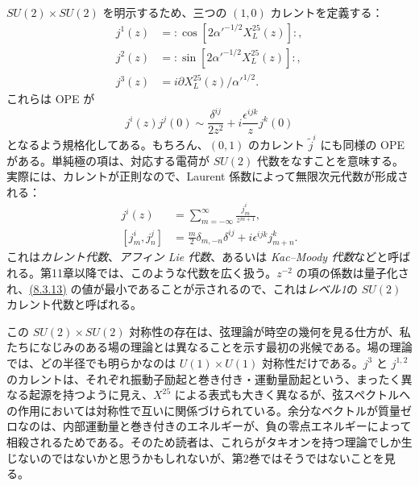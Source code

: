 $SU(2)\times SU(2)$ を明示するため、三つの $(1,0)$ カレントを定義する：
\begin{align}
j^1(z)&=:\cos[2\alpha'^{-1/2}X_L^{25}(z)]:,
\tag{8.3.12a}\label{eq:8.3.12a}\\
j^2(z)&=:\sin[2\alpha'^{-1/2}X_L^{25}(z)]:,
\tag{8.3.12b}\label{eq:8.3.12b}\\
j^3(z)&=i\partial X_L^{25}(z)/\alpha'^{1/2}.
\tag{8.3.12c}\label{eq:8.3.12c}
\end{align}
これらは OPE が
\begin{equation}
j^i(z)j^j(0)\sim\frac{\delta^{ij}}{2z^2}+i\frac{\epsilon^{ijk}}zj^k(0)
\tag{8.3.13}\label{eq:8.3.13}
\end{equation}
となるよう規格化してある。もちろん、$(0,1)$ のカレント $\widetilde j^i$ にも同様の OPE がある。単純極の項は、対応する電荷が $SU(2)$ 代数をなすことを意味する。実際には、カレントが正則なので、Laurent 係数によって無限次元代数が形成される：
\begin{align}
j^i(z)&=\sum_{m=-\infty}^{\infty}\frac{j_m^i}{z^{m+1}},
\tag{8.3.14a}\label{eq:8.3.14a}\\
[j_m^i,j_n^j]&=\frac m2\delta_{m,-n}\delta^{ij}+i\epsilon^{ijk}j_{m+n}^k.
\tag{8.3.14b}\label{eq:8.3.14b}
\end{align}
これは\emph{カレント代数}、\emph{アフィン Lie 代数}、あるいは \emph{Kac--Moody 代数}などと呼ばれる。第11章以降では、このような代数を広く扱う。$z^{-2}$ の項の係数は量子化され、\hyperref[eq:8.3.13]{(8.3.13)} の値が最小であることが示されるので、これは\emph{レベル1}の $SU(2)$ カレント代数と呼ばれる。

この $SU(2)\times SU(2)$ 対称性の存在は、弦理論が時空の幾何を見る仕方が、私たちになじみのある場の理論とは異なることを示す最初の兆候である。場の理論では、どの半径でも明らかなのは $U(1)\times U(1)$ 対称性だけである。$j^3$ と $j^{1,2}$ のカレントは、それぞれ振動子励起と巻き付き・運動量励起という、まったく異なる起源を持つように見え、$X^{25}$ による表式も大きく異なるが、弦スペクトルへの作用においては対称性で互いに関係づけられている。余分なベクトルが質量ゼロなのは、内部運動量と巻き付きのエネルギーが、負の零点エネルギーによって相殺されるためである。そのため読者は、これらがタキオンを持つ理論でしか生じないのではないかと思うかもしれないが、第2巻ではそうではないことを見る。


